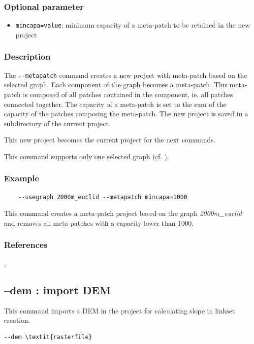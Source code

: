 \documentclass[a4paper,10pt]{report}
\begin{document}
\subsubsection{Optional parameter}
\begin{itemize}
	\item \verb|mincapa=value|: minimum capacity of a meta-patch to be retained in the new project
\end{itemize}

\subsubsection{Description}
The \verb|--metapatch| command creates a new project with meta-patch based on the selected graph. 
Each component of the graph becomes a meta-patch. This meta-patch is composed of all patches contained in the component, ie. all patches connected together.
The capacity of a meta-patch is set to the sum of the capacity of the patches composing the meta-patch.
The new project is saved in a subdirectory of the current project.

This new project becomes the current project for the next commands.

This command supports only one selected graph (cf. ).

\subsubsection{Example}
\begin{Verbatim}
	--usegraph 2000m_euclid --metapatch mincapa=1000
\end{Verbatim}
This command creates a meta-patch project based on the graph \textit{2000m\_euclid} and removes all meta-patches with a capacity lower than 1000.

\subsubsection{References}
\cite{2015_monkey}, \cite{2016_campagnole}

\subsection{--dem : import DEM}
This command imports a DEM in the project for calculating slope in linkset creation.
\begin{Verbatim}[commandchars=\\\{\}]
--dem \textit{rasterfile}
\end{Verbatim}
\end{document}
